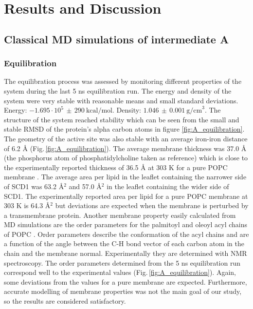 \chapter{Results and Discussion}

\section{Classical MD simulations of intermediate A}
\subsection{Equilibration}
The equilibration process was assessed by monitoring different properties of the system during the last 5 ns equilibration run. The energy and density of the system were very stable with reasonable means and small standard deviations. Energy: $-1.695 \cdot 10^5 \, \pm \, 290 ~ \text{kcal/mol}$. Density: $1.046 \, \pm \, 0.001 ~ \text{g/cm}^3$. The structure of the system reached stability which can be seen from the small and stable RMSD of the protein's alpha carbon atoms in figure \ref{fig:A_equilibration}. The geometry of the active site was also stable with an average iron-iron distance of 6.2 Å (Fig.\,\ref{fig:A_equilibration}). The average membrane thickness was 37.0 Å (the phosphorus atom of phosphatidylcholine taken as reference) which is close to the experimentally reported thickness of 36.5 Å at 303 K for a pure POPC membrane \cite{kucerka2011}. The average area per lipid in the leaflet containing the narrower side of SCD1 was 63.2 Å$^2$ and 57.0 Å$^2$ in the leaflet containing the wider side of SCD1. The experimentally reported area per lipid for a pure POPC membrane at 303 K is 64.3 Å$^2$ \cite{kucerka2011} but deviations are expected when the membrane is perturbed by a transmembrane protein. Another membrane property easily calculated from MD simulations are the order parameters for the palmitoyl and oleoyl acyl chains of POPC \cite{Piggot2017}. Order parameters describe the conformation of the acyl chains and are a function of the angle between the C-H bond vector of each carbon atom in the chain and the membrane normal. Experimentally they are determined with NMR spectroscopy. The order parameters determined from the 5 ns equilibration run correspond well to the experimental values (Fig.\,\ref{fig:A_equilibration}). Again, some deviations from the values for a pure membrane are expected. Furthermore, accurate modelling of membrane properties was not the main goal of our study, so the results are considered satisfactory. 
